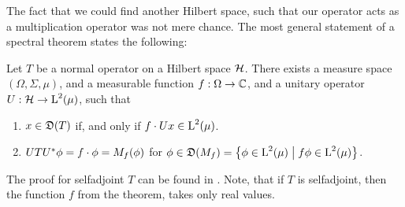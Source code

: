 The fact that we could find another Hilbert space, such that our operator
acts as a multiplication operator was not mere chance. The most general 
statement of a spectral theorem states the following:

\begin{thrm}

Let $T$ be a normal operator on a Hilbert space $\mathcal{H}$. There exists
a measure space $(\Omega, \Sigma, \mu)$, and a measurable function 
$f: \Omega \to \mathbb{C}$, and a unitary operator $U: \mathcal{H} \to \text{L}^2(\mu)$,
such that
\begin{enumerate}[\normalfont (a)]
 \item $x \in \mathfrak{D}(T)$ if, and only if $f \cdot Ux \in \text{L}^2(\mu)$.
 \item $UTU^{*} \phi = f \cdot \phi = M_f(\phi)$ for 
 $\phi \in \mathfrak{D}(M_f) 
 = \left\lbrace \phi \in \text{L}^2(\mu) \bigm | f\phi \in \text{L}^2(\mu) \right\rbrace$.
\end{enumerate}
\end{thrm}
The proof for selfadjoint $T$ can be found in \cite[Ch. VII.4]{WernerFunkAna}.
Note, that if $T$ is selfadjoint, then the function $f$ from the theorem, 
takes only real values.































